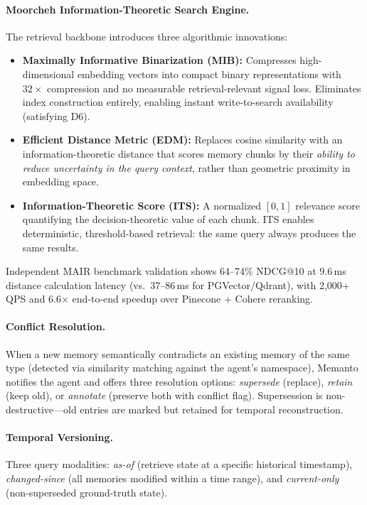 \documentclass[11pt]{article}
\begin{document}
\paragraph{Moorcheh Information-Theoretic Search Engine.}
The retrieval backbone introduces three algorithmic innovations:
\begin{itemize}
    \item \textbf{Maximally Informative Binarization (MIB):} Compresses high-dimensional embedding vectors into compact binary representations with $32\times$ compression and no measurable retrieval-relevant signal loss. Eliminates index construction entirely, enabling instant write-to-search availability (satisfying D6).
    \item \textbf{Efficient Distance Metric (EDM):} Replaces cosine similarity with an information-theoretic distance that scores memory chunks by their \emph{ability to reduce uncertainty in the query context}, rather than geometric proximity in embedding space.
    \item \textbf{Information-Theoretic Score (ITS):} A normalized $[0, 1]$ relevance score quantifying the decision-theoretic value of each chunk. ITS enables deterministic, threshold-based retrieval: the same query always produces the same results.
\end{itemize}
Independent MAIR benchmark validation shows 64--74\% NDCG@10 at 9.6\,ms distance calculation latency (vs.\ 37--86\,ms for PGVector/Qdrant), with 2,000+ QPS and 6.6$\times$ end-to-end speedup over Pinecone + Cohere reranking.

\paragraph{Conflict Resolution.}
When a new memory semantically contradicts an existing memory of the same type (detected via similarity matching against the agent's namespace), Memanto notifies the agent and offers three resolution options: \emph{supersede} (replace), \emph{retain} (keep old), or \emph{annotate} (preserve both with conflict flag). Supersession is non-destructive---old entries are marked but retained for temporal reconstruction.

\paragraph{Temporal Versioning.}
Three query modalities: \emph{as-of} (retrieve state at a specific historical timestamp), \emph{changed-since} (all memories modified within a time range), and \emph{current-only} (non-superseded ground-truth state).
\end{document}
